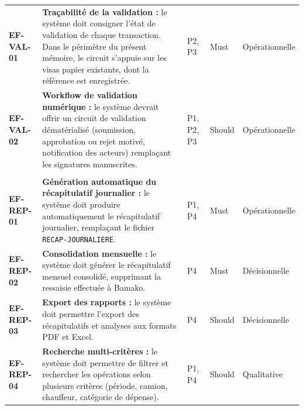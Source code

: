 \begin{longtable}{|>{\raggedright\arraybackslash}p{1.5cm}|>{\raggedright\arraybackslash}p{5.2cm}|>{\raggedright\arraybackslash}p{1.6cm}|>{\raggedright\arraybackslash}p{1.7cm}|>{\raggedright\arraybackslash}p{2.8cm}|}
\multicolumn{5}{|l|}{\cellcolor[HTML]{DDEBF7}\textbf{M2. Validation hiérarchique}} \\ \hline
\textbf{EF-VAL-01} & \textbf{Traçabilité de la validation :} le système doit consigner l'état de validation de chaque transaction. Dans le périmètre du présent mémoire, le circuit s'appuie sur les visas papier existants, dont la référence est enregistrée. & P2, P3 & Must & Opérationnelle \\ \hline
\textbf{EF-VAL-02} & \textbf{Workflow de validation numérique :} le système devrait offrir un circuit de validation dématérialisé (soumission, approbation ou rejet motivé, notification des acteurs) remplaçant les signatures manuscrites. & P1, P2, P3 & Should & Opérationnelle \\ \hline

\multicolumn{5}{|l|}{\cellcolor[HTML]{DDEBF7}\textbf{M3. Consolidation et reporting}} \\ \hline
\textbf{EF-REP-01} & \textbf{Génération automatique du récapitulatif journalier :} le système doit produire automatiquement le récapitulatif journalier, remplaçant le fichier \texttt{RECAP-JOURNALIERE}. & P1, P4 & Must & Opérationnelle \\ \hline
\textbf{EF-REP-02} & \textbf{Consolidation mensuelle :} le système doit générer le récapitulatif mensuel consolidé, supprimant la ressaisie effectuée à Bamako. & P4 & Must & Décisionnelle \\ \hline
\textbf{EF-REP-03} & \textbf{Export des rapports :} le système doit permettre l'export des récapitulatifs et analyses aux formats PDF et Excel. & P4 & Should & Décisionnelle \\ \hline
\textbf{EF-REP-04} & \textbf{Recherche multi-critères :} le système doit permettre de filtrer et rechercher les opérations selon plusieurs critères (période, camion, chauffeur, catégorie de dépense). & P1, P4 & Should & Qualitative \\ \hline


\end{longtable}
